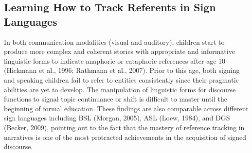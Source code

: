 \documentclass[]{elsarticle} %
\begin{document}
\hypertarget{learning-how-to-track-referents-in-sign-languages}{%
\subsection{Learning How to Track Referents in Sign
Languages}\label{learning-how-to-track-referents-in-sign-languages}}

In both communication modalities (visual and auditory), children start
to produce more complex and coherent stories with appropriate and
informative linguistic forms to indicate anaphoric or cataphoric
references after age 10 (Hickmann et al., 1996; Rathmann et al., 2007).
Prior to this age, both signing and speaking children fail to refer to
entities consistently since their pragmatic abilities are yet to
develop. The manipulation of linguistic forms for discourse functions to
signal topic continuance or shift is difficult to master until the
beginning of formal education. These findings are also comparable across
different sign languages including BSL (Morgan, 2005), ASL (Loew, 1984),
and DGS (Becker, 2009), pointing out to the fact that the mastery of
reference tracking in narratives is one of the most protracted
achievements in the acquisition of signed discourse.
\end{document}

